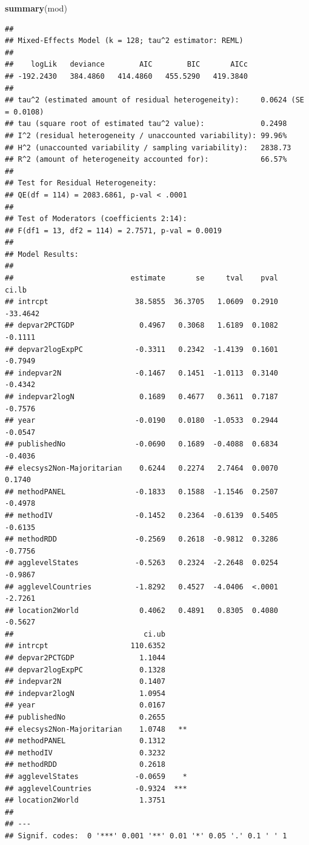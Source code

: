 \documentclass[
]{article}
\newenvironment{Shaded}{\begin{snugshade}}{\end{snugshade}}
\newcommand{\KeywordTok}[1]{\textcolor[rgb]{0.13,0.29,0.53}{\textbf{#1}}}
\newcommand{\NormalTok}[1]{#1}
\begin{document}
\begin{Shaded}
\begin{Highlighting}[]
\KeywordTok{summary}\NormalTok{(mod)}
\end{Highlighting}
\end{Shaded}

\begin{verbatim}
## 
## Mixed-Effects Model (k = 128; tau^2 estimator: REML)
## 
##    logLik   deviance        AIC        BIC       AICc 
## -192.2430   384.4860   414.4860   455.5290   419.3840   
## 
## tau^2 (estimated amount of residual heterogeneity):     0.0624 (SE = 0.0108)
## tau (square root of estimated tau^2 value):             0.2498
## I^2 (residual heterogeneity / unaccounted variability): 99.96%
## H^2 (unaccounted variability / sampling variability):   2838.73
## R^2 (amount of heterogeneity accounted for):            66.57%
## 
## Test for Residual Heterogeneity:
## QE(df = 114) = 2083.6861, p-val < .0001
## 
## Test of Moderators (coefficients 2:14):
## F(df1 = 13, df2 = 114) = 2.7571, p-val = 0.0019
## 
## Model Results:
## 
##                           estimate       se     tval    pval     ci.lb 
## intrcpt                    38.5855  36.3705   1.0609  0.2910  -33.4642 
## depvar2PCTGDP               0.4967   0.3068   1.6189  0.1082   -0.1111 
## depvar2logExpPC            -0.3311   0.2342  -1.4139  0.1601   -0.7949 
## indepvar2N                 -0.1467   0.1451  -1.0113  0.3140   -0.4342 
## indepvar2logN               0.1689   0.4677   0.3611  0.7187   -0.7576 
## year                       -0.0190   0.0180  -1.0533  0.2944   -0.0547 
## publishedNo                -0.0690   0.1689  -0.4088  0.6834   -0.4036 
## elecsys2Non-Majoritarian    0.6244   0.2274   2.7464  0.0070    0.1740 
## methodPANEL                -0.1833   0.1588  -1.1546  0.2507   -0.4978 
## methodIV                   -0.1452   0.2364  -0.6139  0.5405   -0.6135 
## methodRDD                  -0.2569   0.2618  -0.9812  0.3286   -0.7756 
## agglevelStates             -0.5263   0.2324  -2.2648  0.0254   -0.9867 
## agglevelCountries          -1.8292   0.4527  -4.0406  <.0001   -2.7261 
## location2World              0.4062   0.4891   0.8305  0.4080   -0.5627 
##                              ci.ub 
## intrcpt                   110.6352      
## depvar2PCTGDP               1.1044      
## depvar2logExpPC             0.1328      
## indepvar2N                  0.1407      
## indepvar2logN               1.0954      
## year                        0.0167      
## publishedNo                 0.2655      
## elecsys2Non-Majoritarian    1.0748   ** 
## methodPANEL                 0.1312      
## methodIV                    0.3232      
## methodRDD                   0.2618      
## agglevelStates             -0.0659    * 
## agglevelCountries          -0.9324  *** 
## location2World              1.3751      
## 
## ---
## Signif. codes:  0 '***' 0.001 '**' 0.01 '*' 0.05 '.' 0.1 ' ' 1
\end{verbatim}
\end{document}
